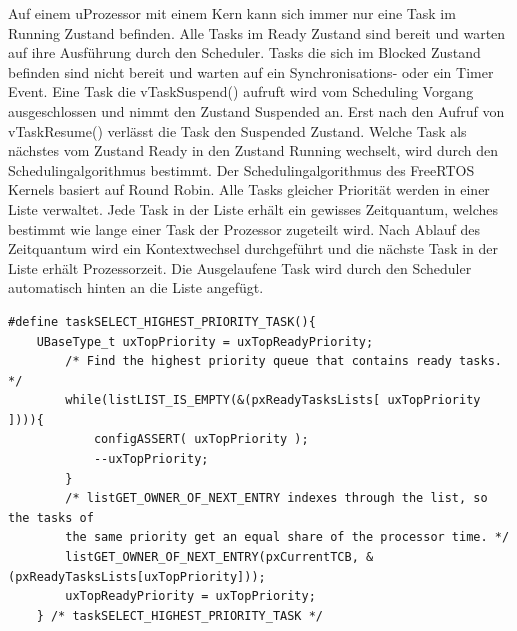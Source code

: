 Auf einem uProzessor mit einem Kern kann sich immer nur eine Task im Running Zustand befinden. Alle Tasks im Ready Zustand sind bereit und warten auf ihre Ausführung durch den Scheduler. Tasks die sich im Blocked Zustand befinden sind nicht bereit und warten auf ein Synchronisations- oder ein Timer Event. Eine Task die vTaskSuspend() aufruft wird vom Scheduling Vorgang ausgeschlossen und nimmt den Zustand Suspended an. Erst nach den Aufruf von vTaskResume() verlässt die Task den Suspended Zustand.  Welche Task als nächstes vom Zustand Ready in den Zustand Running wechselt, wird durch den Schedulingalgorithmus bestimmt. Der Schedulingalgorithmus des FreeRTOS Kernels basiert auf Round Robin\cite{9783827373427}. Alle Tasks gleicher Priorität werden in einer Liste verwaltet. Jede Task in der Liste erhält ein gewisses Zeitquantum, welches bestimmt wie lange einer Task der Prozessor zugeteilt wird. Nach Ablauf des Zeitquantum wird ein Kontextwechsel durchgeführt und die nächste Task in der Liste erhält Prozessorzeit. Die Ausgelaufene Task wird durch den Scheduler automatisch hinten an die Liste angefügt. 
\begin{lstlisting}[caption={Pre-emptive List selection aus Task.c}, linewidth=8cm,captionpos=b, label=lst:nextTask, float=hbt]
#define taskSELECT_HIGHEST_PRIORITY_TASK(){																									
	UBaseType_t uxTopPriority = uxTopReadyPriority;														
		/* Find the highest priority queue that contains ready tasks. */								
		while(listLIST_IS_EMPTY(&(pxReadyTasksLists[ uxTopPriority ]))){																								
			configASSERT( uxTopPriority );																
			--uxTopPriority;																			
		}																								
		/* listGET_OWNER_OF_NEXT_ENTRY indexes through the list, so the tasks of						
		the	same priority get an equal share of the processor time. */									
		listGET_OWNER_OF_NEXT_ENTRY(pxCurrentTCB, &(pxReadyTasksLists[uxTopPriority]));			
		uxTopReadyPriority = uxTopPriority;																
	} /* taskSELECT_HIGHEST_PRIORITY_TASK */
\end{lstlisting}
